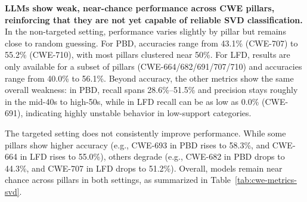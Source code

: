 \documentclass[lettersize,journal]{IEEEtran}
\begin{document}
\textbf{\glspl{LLM} show weak, near-chance performance across CWE pillars, reinforcing that they are not yet capable of reliable \gls{SVD} classification.}
In the non-targeted setting, performance varies slightly by pillar but remains close to random guessing. For \gls{PBD}, accuracies range from 43.1\% (CWE-707) to 55.2\% (CWE-710), with most pillars clustered near 50\%. For \gls{LFD}, results are only available for a subset of pillars (CWE-664/682/691/707/710) and accuracies range from 40.0\% to 56.1\%. Beyond accuracy, the other metrics show the same overall weakness: in \gls{PBD}, recall spans 28.6\%--51.5\% and precision stays roughly in the mid-40s to high-50s, while in \gls{LFD} recall can be as low as 0.0\% (CWE-691), indicating highly unstable behavior in low-support categories.

The targeted setting does not consistently improve performance. While some pillars show higher accuracy (e.g., CWE-693 in \gls{PBD} rises to 58.3\%, and CWE-664 in \gls{LFD} rises to 55.0\%), others degrade (e.g., CWE-682 in \gls{PBD} drops to 44.3\%, and CWE-707 in \gls{LFD} drops to 51.2\%). Overall, models remain near chance across pillars in both settings, as summarized in Table~\ref{tab:cwe-metrics-svd}.
\end{document}
